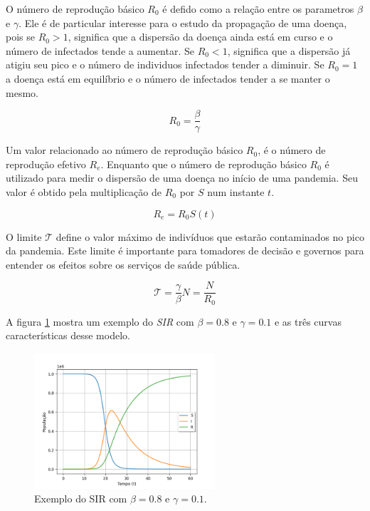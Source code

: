 O número de reprodução básico $R_0$ é defido como a relação entre os parametros
$\beta$ e $\gamma$. Ele é de particular interesse para o estudo da propagação
de uma doença, pois se $R_0 > 1$, significa que a dispersão da doença
ainda está em curso e o número de infectados tende a aumentar. 
Se $R_0 < 1$, significa que a dispersão já atigiu seu pico e o número de individuos
infectados tender a diminuir. Se $R_0 = 1$ a doença está em equilíbrio e o número 
de infectados tender a se manter o mesmo.

\begin{equation}\label{eq:numero-reproducao-basico}
    R_0 = \frac{\beta}{\gamma}
\end{equation}

Um valor relacionado ao número de reprodução básico $R_0$, é o número de reprodução
efetivo $R_e$. Enquanto que o número de reprodução básico $R_0$ é utilizado para
medir o dispersão de uma doença no início de uma pandemia. 
Seu valor é obtido pela multiplicação de $R_0$ por $S$ num instante $t$.

\begin{equation}\label{eq:numero-reproducao-efetivo}
    R_e = R_0 S(t)
\end{equation}

O limite $\mathcal{T}$ define o valor máximo de indivíduos que estarão contaminados
no pico da pandemia. Este limite é importante para tomadores de decisão e governos
para entender os efeitos sobre os serviços de saúde pública.

\begin{equation}
    \mathcal{T} = \frac{\gamma}{\beta}N = \frac{N}{R_0}
\end{equation}

A figura \ref{fig:exemplo-sir} mostra um exemplo do \textit{SIR} com $\beta=0.8$
e $\gamma=0.1$ e as três curvas características desse modelo.

\begin{figure}[H]
\centering
\includegraphics[width=0.6\textwidth]{figuras/sir-example-beta0.8-gamma0.1.png}
\caption{Exemplo do SIR com $\beta=0.8$ e $\gamma=0.1$.}
\label{fig:exemplo-sir}
\end{figure}

